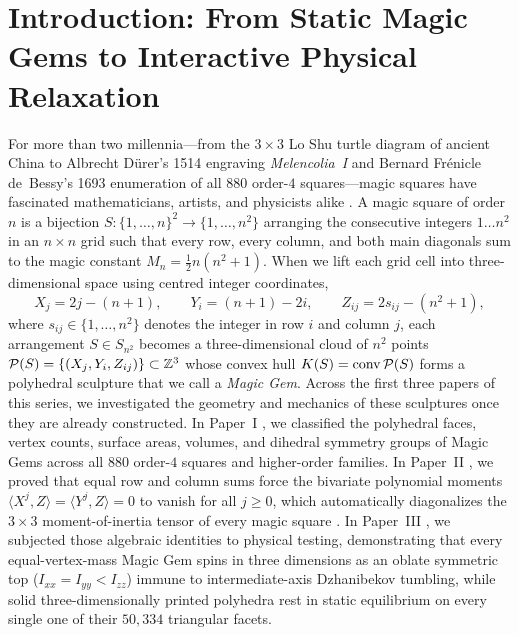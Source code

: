 \section{Introduction: From Static Magic Gems to Interactive Physical Relaxation}
\label{sec:intro}

For more than two millennia---from the $3\times 3$ Lo Shu turtle diagram of ancient China to Albrecht D\"urer's 1514 engraving \emph{Melencolia~I} and Bernard Fr\'enicle de~Bessy's 1693 enumeration of all $880$ order-$4$ squares---magic squares have fascinated mathematicians, artists, and physicists alike \cite{frenicle1693,loubere1693,dudeney1917amusements,andrews1960magic}. A magic square of order $n$ is a bijection $S : \{1,\dots,n\}^2 \to \{1,\dots,n^2\}$ arranging the consecutive integers $1\dots n^2$ in an $n\times n$ grid such that every row, every column, and both main diagonals sum to the magic constant $M_n = \frac{1}{2}n(n^2+1)$. When we lift each grid cell into three-dimensional space using centred integer coordinates,
\begin{equation}
  X_j = 2j - (n+1), \qquad Y_i = (n+1) - 2i, \qquad Z_{ij} = 2s_{ij} - (n^2+1),
  \label{eq:centred_coords}
\end{equation}
where $s_{ij} \in \{1,\dots,n^2\}$ denotes the integer in row $i$ and column $j$, each arrangement $S \in S_{n^2}$ becomes a three-dimensional cloud of $n^2$ points $\mathcal{P}(S) = \{(X_j, Y_i, Z_{ij})\} \subset \mathbb{Z}^3$ whose convex hull $K(S) = \operatorname{conv}\mathcal{P}(S)$ forms a polyhedral sculpture that we call a \emph{Magic Gem}. Across the first three papers of this series, we investigated the geometry and mechanics of these sculptures once they are already constructed. In Paper~I \cite{mathewson2026gems}, we classified the polyhedral faces, vertex counts, surface areas, volumes, and dihedral symmetry groups of Magic Gems across all $880$ order-$4$ squares and higher-order families. In Paper~II \cite{mathewson2026moments}, we proved that equal row and column sums force the bivariate polynomial moments $\langle X^j, Z\rangle = \langle Y^j, Z\rangle = 0$ to vanish for all $j \ge 0$, which automatically diagonalizes the $3\times 3$ moment-of-inertia tensor of every magic square \cite{loly2004invariance,rogers2004inertia}. In Paper~III \cite{mathewson2026mechanics}, we subjected those algebraic identities to physical testing, demonstrating that every equal-vertex-mass Magic Gem spins in three dimensions as an oblate symmetric top ($I_{xx}=I_{yy} < I_{zz}$) immune to intermediate-axis Dzhanibekov tumbling, while solid three-dimensionally printed polyhedra rest in static equilibrium on every single one of their $50{,}334$ triangular facets.

